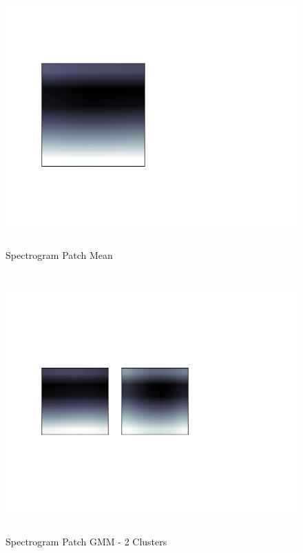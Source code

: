 \documentclass[11pt]{article}
\begin{document}
\begin{figure}[htb]
\centering
\includegraphics[height=10cm]{./spec_patch_clustersGMM1.png}
\caption{\label{fig:spec_patch_clustersGMM1}Spectrogram Patch Mean}
\end{figure}

\begin{figure}[htb]
\centering
\includegraphics[height=10cm]{./spec_patch_clustersGMM2.png}
\caption{\label{fig:spec_patch_clustersGMM2}Spectrogram Patch GMM - 2 Clusters}
\end{figure}
\end{document}
